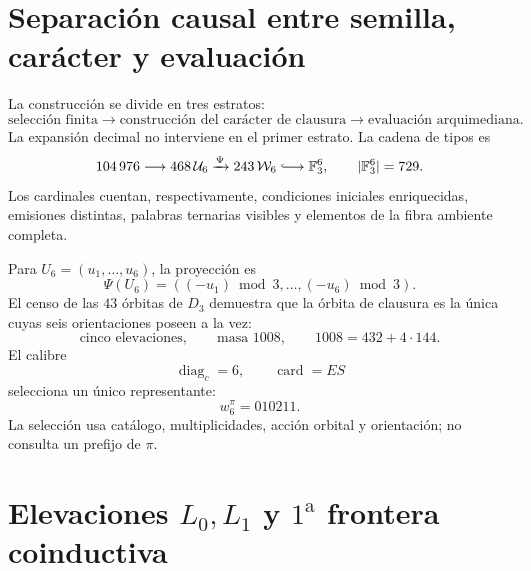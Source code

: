 
\label{gfp:b:chap:biografia-pi-autonoma}

\section{Separación causal entre semilla, carácter y evaluación}

La construcción se divide en tres estratos:
\[
 \text{selección finita}
 \longrightarrow
 \text{construcción del carácter de clausura}
 \longrightarrow
 \text{evaluación arquimediana}.
\]
La expansión decimal no interviene en el primer estrato. La cadena de tipos
es
\begin{equation}
 104\,976
 \longrightarrow468\,\mathcal U_6
 \xrightarrow{\Psi}243\,\mathcal W_6
 \lhook\joinrel\longrightarrow\mathbb F_3^6,
 \qquad|\mathbb F_3^6|=729.
 \label{gfp:b:eq:cadena-tipica-pi-autonoma}
\end{equation}
Los cardinales cuentan, respectivamente, condiciones iniciales
enriquecidas, emisiones distintas, palabras ternarias visibles y elementos
de la fibra ambiente completa.

Para \(U_6=(u_1,\ldots,u_6)\), la proyección es
\[
 \Psi(U_6)=((-u_1)\bmod3,\ldots,(-u_6)\bmod3).
\]
El censo de las \(43\) órbitas de \(D_3\) demuestra que la órbita de
clausura es la única cuyas seis orientaciones poseen a la vez:
\[
 \text{cinco elevaciones},\qquad
 \text{masa }1008,\qquad
 1008=432+4\cdot144.
\]
El calibre
\[
 \operatorname{diag}_c=6,
 \qquad
 \operatorname{card}=ES
\]
selecciona un único representante:
\begin{equation}
 \boxed{w_6^\pi=010211.}
 \label{gfp:b:eq:semilla-pi-autonoma}
\end{equation}
La selección usa catálogo, multiplicidades, acción orbital y orientación;
no consulta un prefijo de \(\pi\).

\section{Elevaciones \texorpdfstring{\(L_0,L_1\)}{L0, L1} y \(1^{\mathrm a}\) frontera coinductiva}

